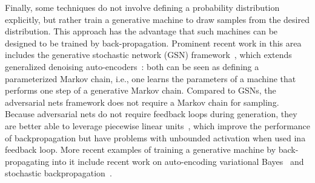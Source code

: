 \documentclass{article} %
\begin{document}
Finally, some techniques do not involve defining a probability distribution explicitly,
but rather train a generative machine to draw samples from the desired distribution.
This approach has the advantage that such machines can be designed to be trained by
back-propagation. Prominent recent work in this area includes the generative stochastic network
(GSN) framework~\citep{Bengio-et-al-ICML2014}, which extends generalized denoising
auto-encoders~\citep{Bengio-et-al-NIPS2013}: both can be seen as defining a
parameterized Markov chain, i.e., one learns the parameters of a machine that
performs one step of a generative Markov chain.
Compared to GSNs, the adversarial nets framework does not require a Markov chain for
sampling. Because adversarial nets do not require feedback loops during generation,
they are better able to leverage piecewise linear
units~\cite{Jarrett-ICCV2009,Glorot+al-AI-2011-small,Goodfellow_maxout_2013},
which improve the performance of backpropagation but have problems with unbounded activation when used ina feedback loop.
More recent examples of training a generative machine by back-propagating into it
include recent work on auto-encoding variational Bayes~\citep{Kingma+Welling-ICLR2014} 
and stochastic backpropagation~\citep{Rezende-et-al-arxiv2014}.
\end{document}
